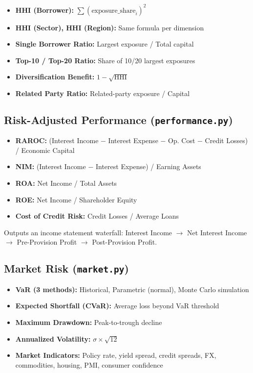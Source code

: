 \documentclass[12pt,a4paper]{article}
\begin{document}
\begin{itemize}
    \item \textbf{HHI (Borrower):} $\sum (\text{exposure\_share}_i)^2$
    \item \textbf{HHI (Sector), HHI (Region):} Same formula per dimension
    \item \textbf{Single Borrower Ratio:} Largest exposure / Total capital
    \item \textbf{Top-10 / Top-20 Ratio:} Share of 10/20 largest exposures
    \item \textbf{Diversification Benefit:} $1 - \sqrt{\text{HHI}}$
    \item \textbf{Related Party Ratio:} Related-party exposure / Capital
\end{itemize}

\subsection{Risk-Adjusted Performance (\texttt{performance.py})}

\begin{itemize}
    \item \textbf{RAROC:} (Interest Income $-$ Interest Expense $-$ Op. Cost $-$ Credit Losses) / Economic Capital
    \item \textbf{NIM:} (Interest Income $-$ Interest Expense) / Earning Assets
    \item \textbf{ROA:} Net Income / Total Assets
    \item \textbf{ROE:} Net Income / Shareholder Equity
    \item \textbf{Cost of Credit Risk:} Credit Losses / Average Loans
\end{itemize}

Outputs an income statement waterfall: Interest Income $\rightarrow$ Net Interest Income $\rightarrow$ Pre-Provision Profit $\rightarrow$ Post-Provision Profit.

\subsection{Market Risk (\texttt{market.py})}

\begin{itemize}
    \item \textbf{VaR (3 methods):} Historical, Parametric (normal), Monte Carlo simulation
    \item \textbf{Expected Shortfall (CVaR):} Average loss beyond VaR threshold
    \item \textbf{Maximum Drawdown:} Peak-to-trough decline
    \item \textbf{Annualized Volatility:} $\sigma \times \sqrt{12}$
    \item \textbf{Market Indicators:} Policy rate, yield spread, credit spreads, FX, commodities, housing, PMI, consumer confidence
\end{itemize}
\end{document}
